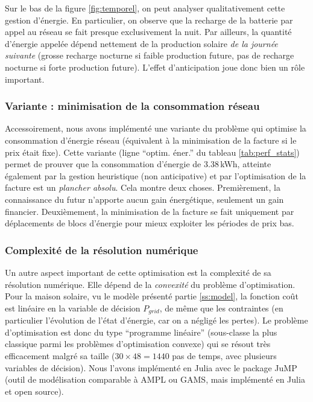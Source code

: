 \documentclass[a4paper,10pt,twocolumn]{article}
\begin{document}
Sur le bas de la figure \ref{fig:temporel}, on peut analyser qualitativement
cette gestion d'énergie. En particulier, on observe que la recharge de la batterie
par appel au réseau se fait presque exclusivement la nuit.
Par ailleurs, la quantité d'énergie appelée dépend nettement de la production solaire
\emph{de la journée suivante} (grosse recharge nocturne si faible production future,
pas de recharge nocturne si forte production future).
L'effet d'anticipation joue donc bien un rôle important.

\subsubsection{Variante : minimisation de la consommation réseau}
Accessoirement, nous avons implémenté une variante du problème
qui optimise la consommation d'énergie réseau 
(équivalent à la minimisation de la facture si le prix était fixe).
Cette variante (ligne ``optim. éner.'' du tableau \ref{tab:perf_stats})
permet de prouver que la consommation d'énergie de 3.38\,kWh,
atteinte également par la gestion heuristique (non anticipative)
et par l'optimisation de la facture est un \emph{plancher absolu}.
Cela montre deux choses.
Premièrement, la connaissance du futur n'apporte aucun gain énergétique,
seulement un gain financier.
Deuxièmement, la minimisation de la facture se fait uniquement
par déplacements de blocs d'énergie pour mieux exploiter les
périodes de prix bas.

\subsubsection{Complexité de la résolution numérique}
\label{sss:opt_complex}

Un autre aspect important de cette optimisation est la complexité
de sa résolution numérique. Elle dépend de la \emph{convexité}
\cite{Boyd:2004:CvxOptim} du problème d'optimisation.
Pour la maison solaire, vu le modèle présenté partie \ref{ss:model},
la fonction coût est linéaire en la variable de décision $P_{grid}$,
de même que les contraintes (en particulier l'évolution de l'état d'énergie,
car on a négligé les pertes).
Le problème d'optimisation est donc du type ``programme linéaire''
(sous-classe la plus classique parmi les problèmes d'optimisation convexe)
qui se résout très efficacement malgré sa taille
($30 \times 48 = 1440$ pas de temps, avec plusieurs variables de décision).
Nous l'avons implémenté en Julia avec le package JuMP\cite{Dunning:2017:JuMP}
(outil de modélisation comparable à AMPL ou GAMS, mais implémenté en Julia
et open source).
\end{document}
